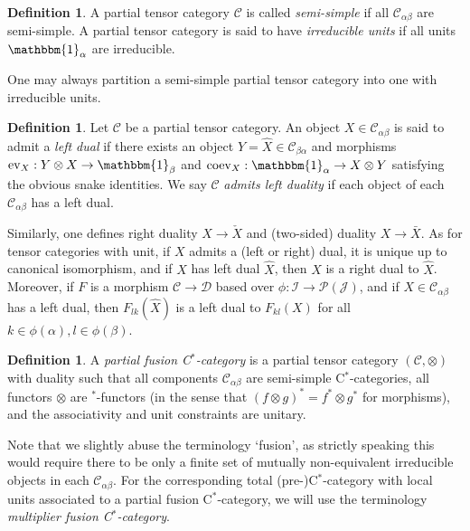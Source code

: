 \documentclass[10pt]{article}
\newcommand{\CatC}{\mathcal{C}}
\newcommand{\CatCC}{\mathscr{C}}
\newcommand{\CatDD}{\mathscr{D}}
\newcommand{\ev}{\mathrm{ev}}
\newcommand{\coev}{\mathrm{coev}}
\newcommand{\Unitb}{\mathbbm{1}}
\theoremstyle{definition}
\newtheorem{Def}[Theorem]{Definition}
\numberwithin{equation}{section}
\begin{document}
\begin{Def} A partial tensor category $\CatCC$ is called \emph{semi-simple} if all $\CatC_{\alpha\beta}$ are semi-simple. A partial tensor category is said to have \emph{irreducible units} if all units $\Unitb_\alpha$ are irreducible. 
\end{Def}

One may always partition a semi-simple partial  tensor category into one with irreducible units.

\begin{Def} Let $\CatCC$ be a partial tensor category. An object $X\in \CatC_{\alpha\beta}$ is said to admit a \emph{left dual} if there exists an object $Y=\hat{X} \in \CatC_{\beta\alpha}$ and morphisms $\ev_{X}: Y\otimes X \rightarrow \Unitb_\beta$ and $\coev_X: \Unitb_\alpha\rightarrow X\otimes Y$ satisfying the obvious snake identities. We say $\CatCC$ \emph{admits left duality} if each object of each $\CatC_{\alpha\beta}$ has a left dual.
\end{Def}

Similarly, one defines right duality $X\rightarrow \check{X}$ and (two-sided) duality $X\rightarrow \bar{X}$. As for tensor categories with unit, if $X$ admits a (left or right) dual, it is unique up to canonical isomorphism, and if $X$ has left dual $\hat{X}$, then $X$ is a right dual to $\hat{X}$. Moreover, if $F$ is a morphism $\CatCC\rightarrow \CatDD$ based over $\phi:\mathscr{I}\rightarrow \mathscr{P}(\mathscr{J})$, and if $X\in \CatC_{\alpha\beta}$ has a left dual, then $F_{lk}(\hat{X})$ is a left dual to $F_{kl}(X)$ for all $k\in \phi(\alpha),l \in\phi(\beta)$.

\begin{Def}\label{DefParFus} A \emph{partial fusion C$^*$-category} is
  a partial tensor category $(\CatC,\otimes)$ with duality such that
  all components $\CatC_{\alpha\beta}$ are semi-simple C$^*$-categories,  all functors $\otimes$ are $^*$-functors (in the sense that $(f\otimes g)^* = f^*\otimes g^*$ for morphisms), and the associativity and unit constraints are unitary.
\end{Def} 

Note that we slightly abuse the terminology `fusion', as strictly speaking this would require there to be only a finite set of mutually non-equivalent irreducible objects in each $\CatC_{\alpha\beta}$. For the corresponding total (pre-)C$^*$-category with local units associated to a partial fusion C$^*$-category, we will use the terminology \emph{multiplier fusion C$^*$-category}.
\end{document}
